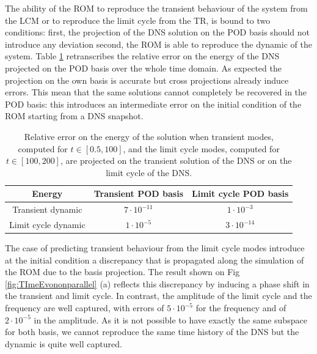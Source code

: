 \documentclass[11pt]{article}
\begin{document}
The ability of the ROM to reproduce the transient behaviour of the system from the LCM or to reproduce the limit cycle from the TR, is bound to two conditions: first, the projection of the DNS solution on the POD basis should not introduce any deviation second, the ROM is able to reproduce the dynamic of the system. Table \ref{tab:energy} retranscribes the relative error on the energy of the DNS projected on the POD basis over the whole time domain. As expected the projection on the own basis is accurate but cross projections already induce errors. This mean that the same solutions cannot completely be recovered in the POD basis: this introduces an intermediate error on the initial condition of the ROM starting from a DNS snapshot.
\begin{table}[!ht]
\begin{center}
\begin{tabular}{ c || c | c |}
 Energy  &  Transient POD basis & Limit cycle POD basis \\ \hline 
 Transient dynamic & $7\cdot 10^{-11}$ & $1\cdot 10^{-3}$ \\ \hline
 Limit cycle dynamic & $1\cdot 10^{-5}$ & $3\cdot 10^{-14}$ \\ \hline
\hline
\end{tabular}
\caption{Relative error on the energy of the solution when transient modes, computed for $t\in [0.5, 100]$, and the limit cycle modes, computed for $t\in [100,200]$, are projected on the transient solution of the DNS or on the limit cycle of the DNS.\label{tab:energy}}
\end{center}
\end{table}

The case of predicting transient behaviour from the limit cycle modes introduce at the initial condition a discrepancy that is propagated along the simulation of the ROM due to the basis projection. The result shown on Fig \ref{fig:TImeEvononparallel} (a) reflects this discrepancy by inducing a phase shift in the transient and limit cycle. In contrast, the amplitude of the limit cycle and the frequency are well captured, with errors of $ 5\cdot 10^{-5}$ for the frequency and of $2\cdot 10^{-5} $ in the amplitude. As it is not possible to have exactly the same subspace for both basis, we cannot reproduce the same time history of the DNS but the dynamic is quite well captured. 
 
\end{document}
